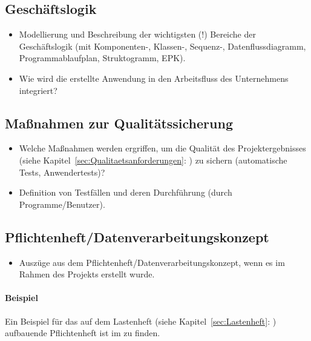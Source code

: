 \subsection{Geschäftslogik}
\label{sec:Geschaeftslogik}

\begin{itemize}
	\item Modellierung und Beschreibung der wichtigsten (!) Bereiche der Geschäftslogik (\zB mit Kom\-po\-nen\-ten-, Klassen-, Sequenz-, Datenflussdiagramm, Programmablaufplan, Struktogramm, \ac{EPK}).
	\item Wie wird die erstellte Anwendung in den Arbeitsfluss des Unternehmens integriert?
\end{itemize}


\subsection{Maßnahmen zur Qualitätssicherung}
\label{sec:Qualitaetssicherung}
\begin{itemize}
	\item Welche Maßnahmen werden ergriffen, um die Qualität des Projektergebnisses (siehe Kapitel~\ref{sec:Qualitaetsanforderungen}: ) zu sichern (\zB automatische Tests, Anwendertests)?
	\item \Ggfs Definition von Testfällen und deren Durchführung (durch Programme/Benutzer).
\end{itemize}


\subsection{Pflichtenheft/Datenverarbeitungskonzept}
\label{sec:Pflichtenheft}
\begin{itemize}
	\item Auszüge aus dem Pflichtenheft/Datenverarbeitungskonzept, wenn es im Rahmen des Projekts erstellt wurde.
\end{itemize}

\paragraph{Beispiel}
Ein Beispiel für das auf dem Lastenheft (siehe Kapitel~\ref{sec:Lastenheft}: ) aufbauende Pflichtenheft ist im  zu finden.

